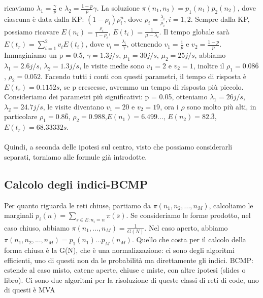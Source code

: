 \documentclass{article}
\begin{document}
ricaviamo $\lambda_1 = \frac{\gamma}{p}$ e $\lambda_2 = \frac{1-p}{p} \gamma$. La soluzione $\pi(n_1, n_2) = p_1(n_1) p_2(n_2)$, dove ciascuna è data dalla KP: $(1-\rho_i)\rho_i^n$, dove $\rho_i = \frac{\lambda_i}{\mu_i}, i=1,2$. Sempre dalla KP, possiamo ricavare $E(n_i) = \frac{\rho_i}{1 - \rho_i}$, $E(t_i) = \frac{1}{\mu - \lambda_i}$. Il tempo globale sarà $E(t_r) = \sum\limits_{i=1}^{2} v_iE(t_i)$, dove $v_i = \frac{\lambda_i}{\gamma}$, ottenendo $v_1 = \frac{1}{p}$ e $v_2 = \frac{1-p}{p}$.\\ Immaginiamo un p = 0.5, $\gamma = 1.3 j/s$, $\mu_1 = 30 j/s$, $\mu_2 = 25 j/s$, abbiamo $\lambda_1 = 2.6 j/s$, $\lambda_2 = 1.3 j/s$, le visite medie sono $v_1 = 2$ e $v_2 = 1$, inoltre il $\rho_1 = 0.08\bar{6}$, $\rho_2 = 0.052$. Facendo tutti i conti con questi parametri, il tempo di risposta è $E(t_r) = 0.1152 s$, se p crescesse, avremmo un tempo di risposta più piccolo.\\ Consideriamo dei parametri più significativi: p = 0.05, otteniamo $\lambda_1 = 26 j/s$, $\lambda_2 = 24.7 j/s$, le visite diventano $v_1 = 20$ e $v_2 = 19$, ora i $\rho$ sono molto più alti, in particolare $\rho_1 = 0.8\bar{6}$, $\rho_2 = 0.988$,$E(n_1) = 6.499...$, $E(n_2) = 82.\bar{3}$, $E(t_r) = 68.33332 s$.\\\\ Quindi, a seconda delle ipotesi sul centro, visto che possiamo considerarli separati, torniamo alle formule già introdotte.
\subsection{Calcolo degli indici-BCMP}
Per quanto riguarda le reti chiuse, partiamo da $\pi(n_1, n_2,...,n_M)$, calcoliamo le marginali $p_i(n) = \sum\limits_{s \in E: n_i = n} \pi(\bar{s})$. Se consideriamo le forme prodotto, nel caso chiuso, abbiamo $\pi(n_1, ..., n_M) = \frac{1}{G(N)}$. Nel caso aperto, abbiamo $\pi(n_1, n_2, ..., n_M) = p_1(n_1)...p_M(n_M)$. Quello che costa per il calcolo della forma chiusa è la G(N), che è una normalizzazione: ci sono degli algoritmi efficienti, uno di questi non da le probabilità ma direttamente gli indici. BCMP: estende al caso misto, catene aperte, chiuse e miste, con altre ipotesi (slides o libro). Ci sono due algoritmi per la risoluzione di queste classi di reti di code, uno di questi è MVA
\end{document}
